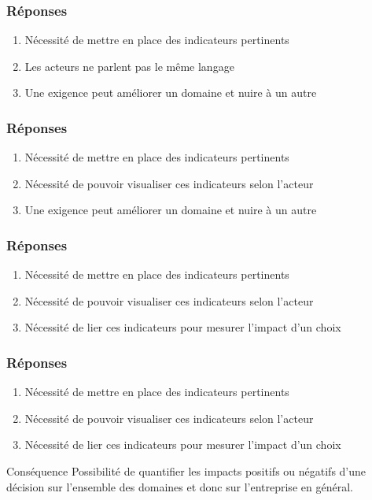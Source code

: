 \documentclass{beamer}
\begin{document}
  \begin{frame}
   \frametitle{Réponses}
   \begin{enumerate}
    \item Nécessité de mettre en place des indicateurs pertinents
    \item Les acteurs ne parlent pas le même langage
    \item Une exigence peut améliorer un domaine et nuire à un autre
   \end{enumerate}
  \end{frame}
  
  \begin{frame}
   \frametitle{Réponses}
   \begin{enumerate}
    \item Nécessité de mettre en place des indicateurs pertinents
    \item Nécessité de pouvoir visualiser ces indicateurs selon l'acteur
    \item Une exigence peut améliorer un domaine et nuire à un autre
   \end{enumerate}
  \end{frame}
  
  \begin{frame}
   \frametitle{Réponses}
   \begin{enumerate}
    \item Nécessité de mettre en place des indicateurs pertinents
    \item Nécessité de pouvoir visualiser ces indicateurs selon l'acteur
    \item Nécessité de lier ces indicateurs pour mesurer l'impact d'un choix
   \end{enumerate}
  \end{frame}
  
  \begin{frame}
   \frametitle{Réponses}
   \begin{enumerate}
    \item Nécessité de mettre en place des indicateurs pertinents
    \item Nécessité de pouvoir visualiser ces indicateurs selon l'acteur
    \item Nécessité de lier ces indicateurs pour mesurer l'impact d'un choix
   \end{enumerate}
   \begin{block}{Conséquence}
    Possibilité de quantifier les impacts positifs ou négatifs d'une décision sur l'ensemble des domaines
    et donc sur l'entreprise en général.
   \end{block}
  \end{frame}
\end{document}
